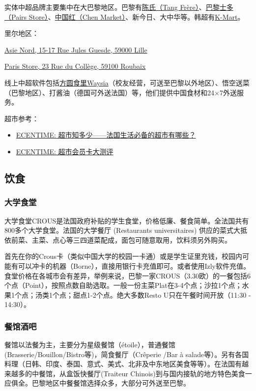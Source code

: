 \documentclass[UTF8]{ctexart}
\begin{document}
实体中超品牌主要集中在大巴黎地区。巴黎有\href{https://www.tang-freres.fr/}{陈氏（Tang Frère）}、\href{https://paris-store.com/}{巴黎士多（Pairs Store）}、\href{https://www.instagram.com/chenmarketfr/?hl=en}{中国红（Chen Market）}、新今日、大中华等。韩超有\href{https://www.instagram.com/kmartfrance/?hl=en}{K-Mart}。

里尔地区：

\href{https://maps.app.goo.gl/arekUkxV9KnKrmaj8}{Asie Nord, 15-17 Rue Jules Guesde, 59000 Lille}

\href{https://maps.app.goo.gl/4teSNmTntTzK39y36}{Paris Store, 23 Rue du Collège, 59100 Roubaix}

线上中超软件包括\href{https://mywaysia.com/en}{方圆食里Waysia}（校友经营，可送至巴黎以外地区）、悟空送菜（巴黎地区）、打酱油（德国可外送法国）等，他们提供中国食材和24$\times$7外送服务。

超市参考：
\begin{itemize}
    \item \href{https://www.ecentime.com/article/supermarket}{ECENTIME: 超市知多少——法国生活必备的超市有哪些？}
    \item \href{https://www.ecentime.com/article/ecentime-supermarketfrance}{ECENTIME: 超市会员卡大测评}
\end{itemize}


\subsection{饮食}

\subsubsection{大学食堂}
大学食堂CROUS是法国政府补贴的学生食堂，价格低廉、餐食简单。全法国共有800多个大学食堂。法国的大学餐厅 (Restaurants universitaires) 供应的菜式大抵依前菜、主菜、点心等三四道菜配成，面包可随意取用，饮料须另外购买。

首先在你的Crous卡（类似中国大学的校园一卡通）或是学生证里充钱，校园内可能有可以冲卡的机器（Borne），直接用银行卡充值即可。或者使用Izly软件充值。食堂价格在各城市会有差异，举例来说，巴黎一家CROUS（3.30欧）的一餐包括6个点（Point），按照点数自助选取。一般一份主菜Plat在3-4个点；沙拉1个点；水果1个点；汤类1个点；甜点1-2个点。绝大多数Resto U只在午餐时间开放（11:30 - 14:30）。

\subsubsection{餐馆酒吧}
餐馆以法餐为主，主要分为星级餐馆（étoile），普通餐馆(Brasserie/Bouillon/Bistro等)，简食餐厅（Crêperie /Bar à salade等）。另有各国料理（日韩、印度、泰国、意式、美式、北非及中东地区美食等等）。在法国有越来越多的中餐馆，从盒饭快餐厅(Traiteur Chinois)到与国内接轨的地方特色美食一应俱全。巴黎地区中餐餐馆选择众多，大部分可外送至巴黎。
\end{document}
